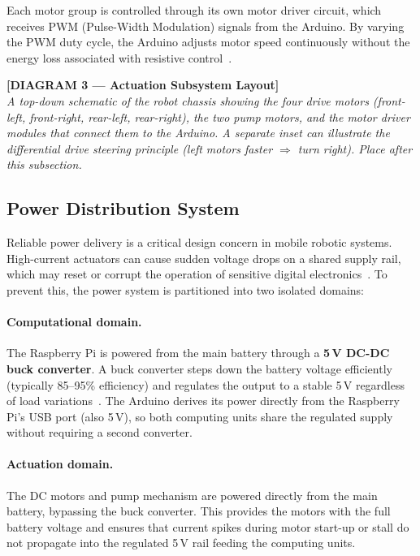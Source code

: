 Each motor group is controlled through its own motor driver circuit,
which receives PWM (Pulse-Width Modulation) signals from the Arduino.
By varying the PWM duty cycle, the Arduino adjusts motor speed
continuously without the energy loss associated with resistive
control~\cite{monk2016electronics}.
 
\bigskip
\noindent\textbf{[DIAGRAM 3 — Actuation Subsystem Layout]}\\
\textit{A top-down schematic of the robot chassis showing the
four drive motors (front-left, front-right, rear-left, rear-right),
the two pump motors, and the motor driver modules that connect them
to the Arduino. A separate inset can illustrate the differential
drive steering principle (left motors faster $\Rightarrow$ turn
right). Place after this subsection.}
\bigskip
 
\subsection{Power Distribution System}
 
Reliable power delivery is a critical design concern in mobile robotic
systems. High-current actuators can cause sudden voltage drops on a
shared supply rail, which may reset or corrupt the operation of
sensitive digital electronics~\cite{horowitz2015art}. To prevent this,
the power system is partitioned into two isolated domains:
 
\paragraph{Computational domain.}
The Raspberry Pi is powered from the main battery through a
\textbf{5\,V DC-DC buck converter}. A buck converter steps down the
battery voltage efficiently (typically 85–95\% efficiency) and
regulates the output to a stable 5\,V regardless of load
variations~\cite{rashid2017power}. The Arduino derives its power
directly from the Raspberry Pi's USB port (also 5\,V), so both
computing units share the regulated supply without requiring a second
converter.
 
\paragraph{Actuation domain.}
The DC motors and pump mechanism are powered directly from the main
battery, bypassing the buck converter. This provides the motors with
the full battery voltage and ensures that current spikes during motor
start-up or stall do not propagate into the regulated 5\,V rail
feeding the computing units.
 

